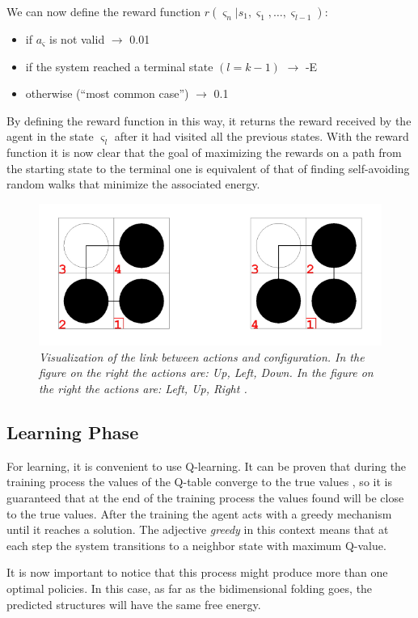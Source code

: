 We can now define the reward function $r(\varsigma_{n}|s_{1}, \varsigma_{1}, \ldots, \varsigma_{l-1})$:
\begin{itemize}
    \item if $a_{\varsigma}$ is not valid $\rightarrow$ 0.01
    \item if the system reached a terminal state $(l = k-1)$ $\rightarrow$ -E
    \item otherwise (``most common case'') $\rightarrow$ 0.1
\end{itemize}
By defining the reward function in this way, it returns the reward received by the agent in the state $\varsigma_{l}$ after it had visited all the previous states.
With the reward function it is now clear that the goal of maximizing the rewards on a path from the starting state to the terminal one is equivalent of that of finding self-avoiding random walks that minimize the associated energy.
\begin{figure}[H]
    \centering
    \includegraphics[width=.75\textwidth]{img/rl1.png}
    \caption{\emph{Visualization of the link between actions and configuration. In the figure on the right the actions are: Up, Left, Down. In the figure on the right the actions are: Left, Up, Right \cite{czibula2011reinforcement}.}}
    \label{fig:rl1}
\end{figure}

\subsection{Learning Phase}
For learning, it is convenient to use Q-learning.
It can be proven that during the training process the values of the Q-table converge to the true values \cite{czibula2011reinforcement}, so it is guaranteed that at the end of the training process the values found will be close to the true values.
After the training the agent acts with a greedy mechanism until it reaches a solution.
The adjective \emph{greedy} in this context means that at each step the system transitions to a neighbor state with maximum Q-value.

It is now important to notice that this process might produce more than one optimal policies.
In this case, as far as the bidimensional folding goes, the predicted structures will have the same free energy.


